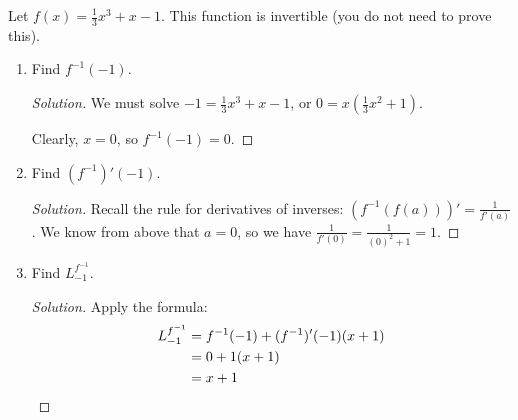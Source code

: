 \documentclass{agony}
\begin{document}
\question Let $f(x)=\frac13x^3+x-1$. This function is invertible (you do not need to prove this).
\begin{enumerate}
  \item Find $f^{-1}(-1)$.
        \begin{proof}[Solution]
          We must solve $-1=\frac13x^3+x-1$, or $0=x(\frac13x^2+1)$.

          Clearly, $x=0$, so $f^{-1}(-1)=0$.
        \end{proof}
  \item Find $(f^{-1})'(-1)$.
        \begin{proof}[Solution]
          Recall the rule for derivatives of inverses: $(f^{-1}(f(a)))' = \frac{1}{f'(a)}$.
          We know from above that $a=0$, so we have $\frac{1}{f'(0)}=\frac{1}{(0)^2+1}=1$.
        \end{proof}
  \item Find $L^{f^{-1}}_{-1}$.
        \begin{proof}[Solution]
          Apply the formula:
          \begin{align*}
            L^{f^{-1}}_{-1} & = f^{-1}(-1)+(f^{-1})'(-1)(x+1) \\
                            & = 0 + 1(x+1)                    \\
                            & = x+1 \qedhere
          \end{align*}
        \end{proof}
\end{enumerate}
\end{document}
